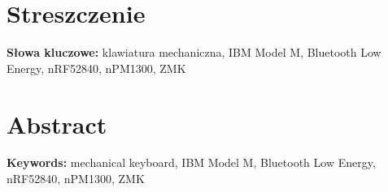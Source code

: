 \chapter*{Streszczenie}

\noindent\textbf{Słowa kluczowe:} klawiatura mechaniczna, IBM Model M, Bluetooth Low Energy, nRF52840, nPM1300, ZMK

\chapter*{Abstract}

\noindent\textbf{Keywords:} mechanical keyboard, IBM Model M, Bluetooth Low Energy, nRF52840, nPM1300, ZMK
